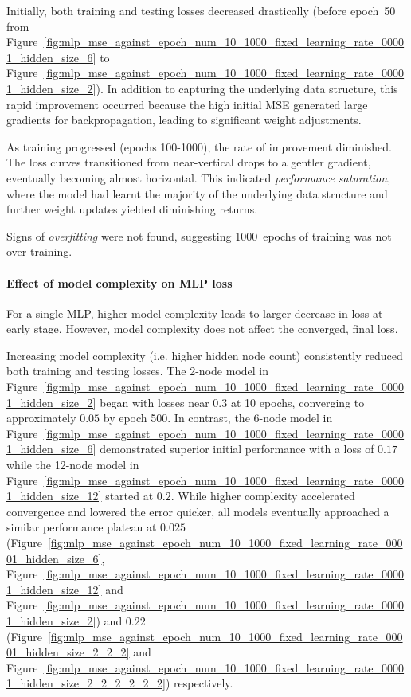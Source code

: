 Initially, both training and testing losses decreased drastically (before epoch~50 from Figure~\ref{fig:mlp_mse_against_epoch_num_10_1000_fixed_learning_rate_00001_hidden_size_6} to Figure~\ref{fig:mlp_mse_against_epoch_num_10_1000_fixed_learning_rate_00001_hidden_size_2}). In addition to capturing the underlying data structure, this rapid improvement occurred because the high initial MSE generated large gradients for backpropagation, leading to significant weight adjustments. 

As training progressed (epochs 100-1000), the rate of improvement diminished. The loss curves transitioned from near-vertical drops to a gentler gradient, eventually becoming almost horizontal. This indicated \textit{performance saturation}, where the model had learnt the majority of the underlying data structure and further weight updates yielded diminishing returns. 

Signs of \textit{overfitting} were not found, suggesting 1000~epochs of training was not over-training. 

\paragraph{Effect of model complexity on MLP loss}
For a single MLP, higher model complexity leads to larger decrease in loss at early stage. However, model complexity does not affect the converged, final loss. 

Increasing model complexity (i.e. higher hidden node count) consistently reduced both training and testing losses. The 2-node model in Figure~\ref{fig:mlp_mse_against_epoch_num_10_1000_fixed_learning_rate_00001_hidden_size_2} began with losses near $0.3$ at 10 epochs, converging to approximately $0.05$ by epoch 500. In contrast, the 6-node model in Figure~\ref{fig:mlp_mse_against_epoch_num_10_1000_fixed_learning_rate_00001_hidden_size_6} demonstrated superior initial performance with a loss of $0.17$ while the 12-node model in Figure~\ref{fig:mlp_mse_against_epoch_num_10_1000_fixed_learning_rate_00001_hidden_size_12} started at $0.2$. While higher complexity accelerated convergence and lowered the error quicker, all models eventually approached a similar performance plateau at $0.025$ (Figure~\ref{fig:mlp_mse_against_epoch_num_10_1000_fixed_learning_rate_00001_hidden_size_6}, Figure~\ref{fig:mlp_mse_against_epoch_num_10_1000_fixed_learning_rate_00001_hidden_size_12} and Figure~\ref{fig:mlp_mse_against_epoch_num_10_1000_fixed_learning_rate_00001_hidden_size_2}) and $0.22$ (Figure~\ref{fig:mlp_mse_against_epoch_num_10_1000_fixed_learning_rate_00001_hidden_size_2_2_2} and Figure~\ref{fig:mlp_mse_against_epoch_num_10_1000_fixed_learning_rate_00001_hidden_size_2_2_2_2_2_2}) respectively. 

